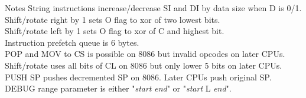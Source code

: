 \documentclass{sheet}
\begin{document}
\begin{multicols}{3}
\begin{table-X}{Notes}
String instructions increase/decrease SI and DI by data size when D is 0/1. \\
Shift/rotate right by 1 sets O flag to xor of two lowest bits. \\
Shift/rotate left by 1 sets O flag to xor of C and highest bit. \\
Instruction prefetch queue is 6 bytes. \\
POP and MOV to CS is possible on 8086 but invalid opcodes on later CPUs. \\
Shift/rotate uses all bits of CL on 8086 but only lower 5 bits on later CPUs. \\
PUSH SP pushes decremented SP on 8086. Later CPUs push original SP. \\
DEBUG range parameter is either "\emph{start} \emph{end}" or "\emph{start} L \emph{end}". \\
\end{table-X}
%
\end{multicols}
\end{document}
